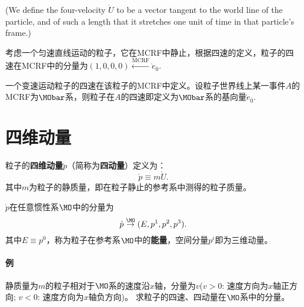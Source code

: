 (We define the four-velocity $\grave{U}$ to be a vector tangent to the world line of the particle, and of such a length that it stretches one unit of time in that particle's frame.)

考虑一个匀速直线运动的粒子，它在MCRF中静止，根据四速的定义，粒子的四速在MCRF中的分量为$(1, 0, 0, 0) \stackrel{\text{MCRF}}{\leftarrow} \grave{e}_0$.

一个变速运动粒子的四速在该粒子的MCRF中定义。设粒子世界线上某一事件$A$的MCRF为$\MObar$系，则粒子在$A$的四速即定义为$\MObar$系的基向量$\grave{e}_{\bar{0}}$.

\section{四维动量}
\label{sec:fourMomentum}
粒子的{\bf 四维动量}$\grave{p}$（简称为{\bf 四动量}）定义为：
\begin{equation}
	\grave{p} \equiv m \grave{U}.
\end{equation}
其中$m$为粒子的静质量，即在粒子静止的参考系中测得的粒子质量。

$\grave{p}$在任意惯性系$\MO$中的分量为
\begin{equation}
    \grave{p} \stackrel{\MO}{\rightarrow} (E, p^1, p^2, p^3).
\end{equation}
其中$E \equiv p^0$，称为粒子在参考系$\MO$中的{\bf 能量}，空间分量$p^i$即为三维动量。

\paragraph{例}
静质量为$m$的粒子相对于$\MO$系的速度沿$x$轴，分量为$v$($v > 0$: 速度方向为$x$轴正方向; $v < 0$: 速度方向为$x$轴负方向)。 求粒子的四速、四动量在$\MO$系中的分量。

